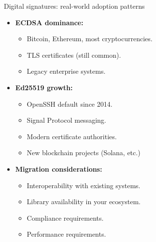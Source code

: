 \documentclass[aspectratio=169, lualatex, handout]{beamer}
\begin{document}
\begin{frame}{Digital signatures: real-world adoption patterns}
	\begin{itemize}[<+->]
		\item \textbf{ECDSA dominance:}
		      \begin{itemize}
			      \item Bitcoin, Ethereum, most cryptocurrencies.
			      \item TLS certificates (still common).
			      \item Legacy enterprise systems.
		      \end{itemize}
		\item \textbf{Ed25519 growth:}
		      \begin{itemize}
			      \item OpenSSH default since 2014.
			      \item Signal Protocol messaging.
			      \item Modern certificate authorities.
			      \item New blockchain projects (Solana, etc.)
		      \end{itemize}
		\item \textbf{Migration considerations:}
		      \begin{itemize}
			      \item Interoperability with existing systems.
			      \item Library availability in your ecosystem.
			      \item Compliance requirements.
			      \item Performance requirements.
		      \end{itemize}
	\end{itemize}
\end{frame}
\end{document}
